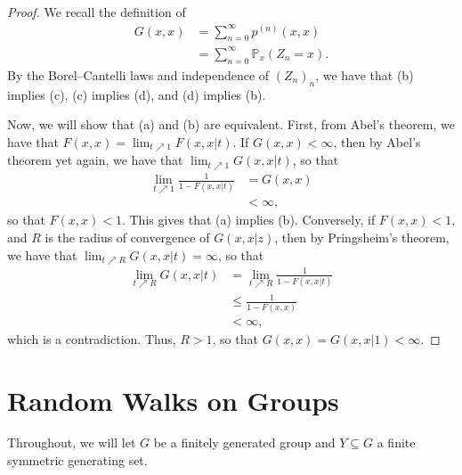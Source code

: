 \documentclass[10pt]{mypackage}
\begin{document}
\begin{proof}
  We recall the definition of
  \begin{align*}
    G\left( x,x \right) &= \sum_{n=0}^{\infty} p^{(n)}\left( x,x \right)\\
                        &= \sum_{n=0}^{\infty} \mathbb{P}_x\left( Z_n = x \right).
  \end{align*}
  By the Borel--Cantelli laws and independence of $\left( Z_n \right)_n$, we have that (b) implies (c), (c) implies (d), and (d) implies (b).

  Now, we will show that (a) and (b) are equivalent. First, from Abel's theorem, we have that $F\left( x,x \right) = \lim_{t\nearrow 1}F\left( x,x|t \right)$. If $G\left( x,x \right) < \infty$, then by Abel's theorem yet again, we have that $\lim_{t\nearrow 1}G\left( x,x|t \right)$, so that
  \begin{align*}
    \lim_{t\nearrow 1}\frac{1}{1-F\left( x,x|t \right)} &= G\left( x,x \right)\\
                                                        &< \infty,
  \end{align*}
  so that $F\left( x,x \right) < 1$. This gives that (a) implies (b). Conversely, if $F\left( x,x \right) < 1$, and $R$ is the radius of convergence of $G\left( x,x|z \right)$, then by Pringsheim's theorem, we have that $\lim_{t\nearrow R} G\left( x,x|t \right) = \infty$, so that
  \begin{align*}
    \lim_{t\nearrow R} G\left( x,x|t \right) &= \lim_{t\nearrow R} \frac{1}{1-F\left( x,x|t \right)}\\
                                             &\leq \frac{1}{1-F\left( x,x \right)}\\
                                             &< \infty,
  \end{align*}
  which is a contradiction. Thus, $R > 1$, so that $G\left( x,x \right) = G\left( x,x|1 \right) < \infty$.
\end{proof}
\section{Random Walks on Groups}%
Throughout, we will let $G$ be a finitely generated group and $Y\subseteq G$ a finite symmetric generating set.
\end{document}
